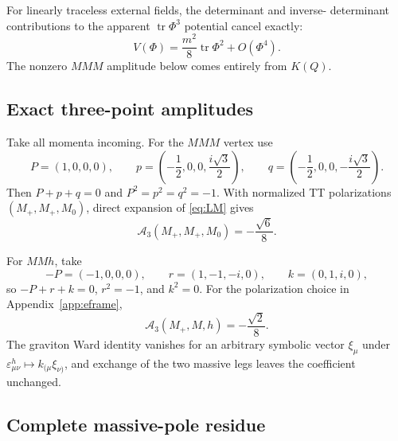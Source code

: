 \documentclass[11pt]{article}
\theoremstyle{definition}
\theoremstyle{remark}
\begin{document}
For linearly traceless external fields, the determinant and inverse-
determinant contributions to the apparent $\operatorname{tr}\Phi^3$
potential cancel exactly:
\begin{equation}\label{eq:potentialcancel}
V(\Phi)=\frac{m^2}{8}\operatorname{tr}\Phi^2+O(\Phi^4).
\end{equation}
The nonzero $MMM$ amplitude below comes entirely from $K(Q)$.

\subsection{Exact three-point amplitudes}

Take all momenta incoming.  For the $MMM$ vertex use
\begin{equation}\label{eq:mmmkin}
P=(1,0,0,0),\qquad
p=\left(-\frac12,0,0,\frac{i\sqrt3}{2}\right),\qquad
q=\left(-\frac12,0,0,-\frac{i\sqrt3}{2}\right).
\end{equation}
Then $P+p+q=0$ and $P^2=p^2=q^2=-1$.  With normalized TT
polarizations $(M_+,M_+,M_0)$, direct expansion of \eqref{eq:LM} gives
\begin{equation}\label{eq:mmmvalue}
\boxed{\mathcal A_3(M_+,M_+,M_0)=-\frac{\sqrt6}{8}.}
\end{equation}

For $MMh$, take
\begin{equation}\label{eq:mmhkin}
-P=(-1,0,0,0),\qquad
r=(1,-1,-i,0),\qquad
k=(0,1,i,0),
\end{equation}
so $-P+r+k=0$, $r^2=-1$, and $k^2=0$.  For the polarization choice in
Appendix~\ref{app:eframe},
\begin{equation}\label{eq:mmhvalue}
\boxed{\mathcal A_3(M_+,M,h)=-\frac{\sqrt2}{8}.}
\end{equation}
The graviton Ward identity vanishes for an arbitrary symbolic vector
$\xi_\mu$ under
$\varepsilon^h_{\mu\nu}\mapsto k_{(\mu}\xi_{\nu)}$, and exchange of
the two massive legs leaves the coefficient unchanged.

\subsection{Complete massive-pole residue}
\end{document}
